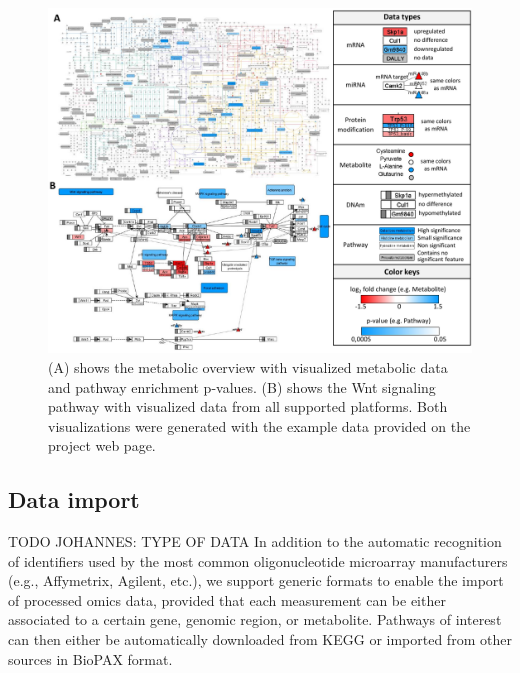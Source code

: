 \documentclass[final,5p,times,twocolumn]{elsarticle}
\begin{document}
\begin{figure}[t]
\center
\includegraphics[width=1.0\textwidth]{InCroMAP_examples.pdf}
\caption{(A) shows the metabolic overview with visualized metabolic data and pathway enrichment p-values. (B) shows the Wnt signaling pathway with visualized data from all supported platforms. Both visualizations were generated with the example data provided on the project web page.}
\label{fig:incromap-examples}
\end{figure}


\subsection{Data import}
TODO JOHANNES: TYPE OF DATA
In addition to the automatic recognition of identifiers used by the most common oligonucleotide microarray manufacturers (e.g., Affymetrix, Agilent, etc.), we support generic formats to enable the import of processed omics data, provided that each measurement can be either associated to a certain gene, genomic region, or metabolite. Pathways of interest can then either be automatically downloaded from KEGG or imported from other sources in BioPAX format. 
\end{document}

